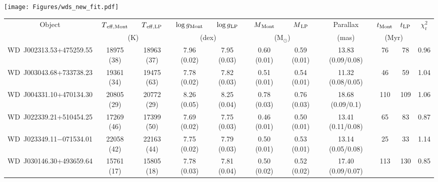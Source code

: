 \documentclass[fleqn,usenatbib, useAMS]{mnras}
\newcommand{\Teff}{\mbox{$T_{\mathrm{eff}}$}}
\newcommand{\logg}{\mbox{$\log g$}}
\newcommand{\totalnumber}{311}
\begin{document}
\begin{figure*}
\centering
\texttt{[image: Figures/wds\_new\_fit.pdf]}
\caption{Same as Fig.\,\ref{fig:spec_fit_wd_good} but for the white dwarfs where our COS data represent the first spectroscopic observations. The right panels show the photometric measurements from \textit{Gaia} \citep{nicola2021}, Est22 \citet{Esteban2022}, MWDD \citep{mwdd}, and Pan-STARRS in this work.}
\label{fig:spec_fit_wd_new}
\end{figure*}

\begin{table*}
\centering
\caption{COS atmospheric parameters of 49 white dwarfs discovered by \textit{Gaia} (GF21) where the first spectroscopic observations were obtained as part of our \textit{HST} study. The subscript "Mont" and "LP" in \Teff, \logg, $M$ (mass), and $t$ (cooling age) denote the fit values obtained from Montreal and La Plata M-R relations respectively. The full table comprising details of \totalnumber\ white dwarfs is available online through Vizier.}
\addtolength{\tabcolsep}{-1pt}
\begin{tabular}{ccccccccccc}
\hline
Object & $T\rm{_{eff,Mont}}$ & $T\rm{_{eff,LP}}$ & $\log g\rm{_{Mont}}$ & $\log g\rm{_{LP}}$  & $M\rm{_{Mont}}$ & $M\rm{_{LP}}$ & Parallax & $t\rm{_{Mont}}$ & $t\rm{_{LP}}$ & $\chi^{2}_\mathrm{r}$\\
& \multicolumn{2}{c}{(K)} & \multicolumn{2}{c}{(dex)}  & \multicolumn{2}{c}{(M$_\odot$)} &(mas)& \multicolumn{2}{c}{(Myr)}\\
\hline
WD\	J002313.53+475259.55	&	18975	(38)	&	18963	(37)	&	7.96	(0.02)	&	7.95	(0.03)	&	0.60	(0.01)	&	0.59	(0.01)	&	13.83	(0.09/0.08)	&	76	&	78	&	0.96	\\
WD\	J003043.68+733738.23	&	19361	(34)	&	19475	(63)	&	7.78	(0.02)	&	7.82	(0.03)	&	0.51	(0.01)	&	0.54	(0.01)	&	11.32	(0.08/0.05)	&	46	&	59	&	1.04	\\
WD\	J004331.10+470134.30	&	20805	(29)	&	20772	(29)	&	8.26	(0.05)	&	8.25	(0.04)	&	0.78	(0.03)	&	0.76	(0.03)	&	18.68	(0.09/0.1)	&	110	&	109	&	1.06	\\
WD\	J022339.21+510454.25	&	17269	(46)	&	17399	(50)	&	7.69	(0.02)	&	7.75	(0.03)	&	0.46	(0.01)	&	0.50	(0.01)	&	13.41	(0.11/0.08)	&	65	&	83	&	0.87	\\
WD\	J023349.11$-$071534.01	&	22058	(42)	&	22163	(44)	&	7.75	(0.02)	&	7.79	(0.03)	&	0.50	(0.01)	&	0.53	(0.01)	&	13.14	(0.05/0.08)	&	25	&	33	&	1.14	\\
WD\	J030146.30+493659.64	&	15761	(17)	&	15805	(18)	&	7.78	(0.03)	&	7.81	(0.04)	&	0.50	(0.02)	&	0.52	(0.02)	&	17.40	(0.09/0.07)	&	113	&	130	&	0.85	\\

\end{tabular}
\end{table*}
\end{document}
